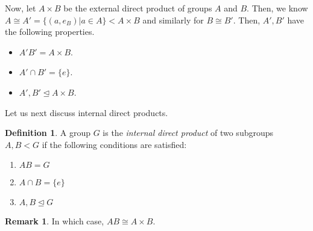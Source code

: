 \documentclass[11pt,leqno,oneside]{amsart}
\newcommand{\subgroup}{\mathrel{<}}
\newcommand{\normsubgroup}{\mathrel{\unlhd}}
\newcommand{\isom}{\mathrel{\cong}}
\theoremstyle{definition}
\newtheorem{defn}[thm]{Definition}
\newtheorem*{rmk*}{Remark}
\numberwithin{equation}{section}
\begin{document}
Now, let $A \times B$ be the external direct product of groups $A$ and $B$.
Then, we know $A \isom A' = \{(a,e_B) | a \in A\} \subgroup A \times B$ and
similarly for $B \isom B'$. Then, $A',B'$ have the following properties.
\begin{itemize}
    \item $A'B' = A \times B$.
    \item $A' \cap B' = \{e\}$.
    \item $A', B' \normsubgroup A \times B$.
\end{itemize}

Let us next discuss internal direct products.

\begin{defn}
    A group $G$ is the \emph{internal direct product} of two subgroups $A,B
    \subgroup G$ if the following conditions are satisfied:
    \begin{enumerate}[label=\roman*)]
        \item $AB = G$
        \item $A \cap B = \{e\}$
        \item $A,B \normsubgroup G$
    \end{enumerate}
\end{defn}
\begin{rmk*}
    In which case, $AB \isom A \times B$.
\end{rmk*}
\end{document}
